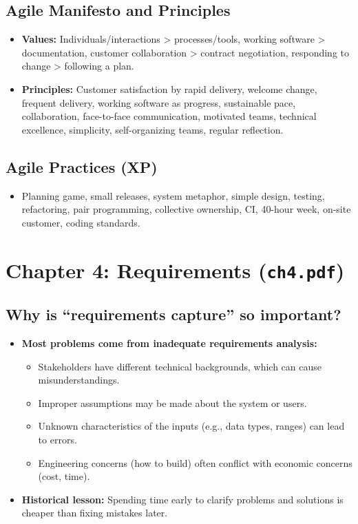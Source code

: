 \documentclass[11pt,a4paper]{article}
\begin{document}
\subsection*{Agile Manifesto and Principles}
\begin{itemize}
    \item \textbf{Values:} Individuals/interactions > processes/tools, working software > documentation, customer collaboration > contract negotiation, responding to change > following a plan.
    \item \textbf{Principles:} Customer satisfaction by rapid delivery, welcome change, frequent delivery, working software as progress, sustainable pace, collaboration, face-to-face communication, motivated teams, technical excellence, simplicity, self-organizing teams, regular reflection.
\end{itemize}

\subsection*{Agile Practices (XP)}
\begin{itemize}
    \item Planning game, small releases, system metaphor, simple design, testing, refactoring, pair programming, collective ownership, CI, 40-hour week, on-site customer, coding standards.
\end{itemize}

\newpage

\section{Chapter 4: Requirements (\texttt{ch4.pdf})}

\subsection*{Why is ``requirements capture'' so important?}
\begin{itemize}
    \item \textbf{Most problems come from inadequate requirements analysis:}
        \begin{itemize}
            \item Stakeholders have different technical backgrounds, which can cause misunderstandings.
            \item Improper assumptions may be made about the system or users.
            \item Unknown characteristics of the inputs (e.g., data types, ranges) can lead to errors.
            \item Engineering concerns (how to build) often conflict with economic concerns (cost, time).
        \end{itemize}
    \item \textbf{Historical lesson:} Spending time early to clarify problems and solutions is cheaper than fixing mistakes later.
\end{itemize}
\end{document}
